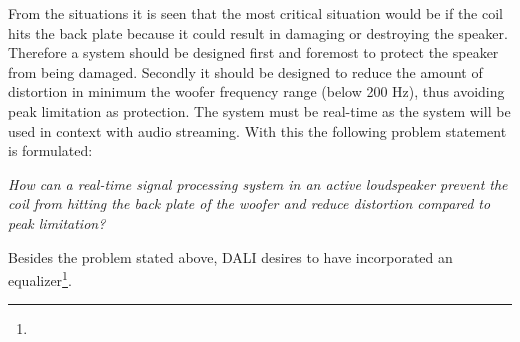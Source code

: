 From the situations it is seen that the most critical situation would be if the coil hits the back plate because it could result in damaging or destroying the speaker. Therefore a system should be designed first and foremost to protect the speaker from being damaged. Secondly it should be designed to reduce the amount of distortion in minimum the woofer frequency range (below 200 Hz), thus avoiding peak limitation as protection. The system must be real-time as the system will be used in context with audio streaming. With this the following problem statement is formulated:

\begin{center}
\label{ProblemStatement}
\textit{How can a real-time signal processing system in an active loudspeaker prevent the coil from hitting the back plate of the woofer and reduce distortion compared to peak limitation?}
\end{center}

Besides the problem stated above, DALI desires to have incorporated an equalizer\footnote{ }. %




